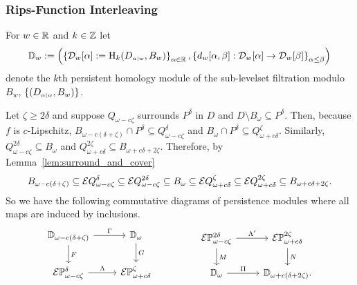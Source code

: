 
\subsubsection{Rips-Function Interleaving}

For $w\in\mathbb{R}$ and $k\in\mathbb{Z}$ let
\[ \mathbb{D}_{w} := \left(\left\{\mathcal{D}_{w}[\alpha] := \mathrm{H}_k(D_{\scriptscriptstyle \alpha\mid w},B_w)\right\}_{\alpha\in\mathbb{R}},\left\{d_w[\alpha,\beta] : \mathcal{D}_{w}[\alpha]\to\mathcal{D}_{w}[\beta]\right\}_{\alpha\leq\beta}\right)\]
denote the $k$th persistent homology module of the sub-levelset filtration modulo $B_w$, $\{(D_{\scriptscriptstyle \alpha\mid w},B_w)\}$.

Let $\zeta\geq 2\delta$ and suppose $Q_{\omega-c\zeta}$ surrounds $P^\delta$ in $D$ and $D\setminus B_\omega\subseteq P^\delta$.
Then, because $f$ is $c$-Lipschitz, $B_{\omega-c(\delta+\zeta)}\cap P^\delta\subseteq Q_{\omega-c\zeta}^\delta$ and $B_\omega\cap P^\delta\subseteq Q_{\omega+c\delta}^\zeta$.
Similarly, $Q_{\omega-c\zeta}^{2\delta}\subseteq B_\omega$ and $Q_{\omega+c\delta}^{2\zeta}\subseteq B_{\omega+c{\delta+2\zeta}}$.
Therefore, by Lemma~\ref{lem:surround_and_cover}
\[ B_{\omega-c(\delta+\zeta)}\subseteq \mathcal{E} Q_{\omega-c\zeta}^\delta\subseteq\mathcal{E} Q_{\omega-c\zeta}^{2\delta}\subseteq B_\omega
  \subseteq \mathcal{E} Q_{\omega+c\delta}^\zeta\subseteq \mathcal{E} Q_{\omega+c\delta}^{2\zeta}\subseteq B_{\omega+c{\delta+2\zeta}}.\]
So we have the following commutative diagrams of persistence modules where all maps are induced by inclusions.
\[\begin{tikzcd}
    \DD{\omega-c(\delta+\zeta)} \arrow{r}{\Gamma}\arrow{d}{F} &
    \DD{\omega} \arrow{d}{G}\\
    \E\PP{\omega-c\zeta}{\delta}\arrow{r}{\Lambda} &
    \E\PP{\omega+c\delta}{\zeta}
  \end{tikzcd}\hspace{10ex}
  \begin{tikzcd}
    \E\PP{\omega-c\zeta}{2\delta} \arrow{r}{\Lambda'}\arrow{d}{M} &
    \E\PP{\omega+c\delta}{2\zeta}\arrow{d}{N}\\
    \DD{\omega} \arrow{r}{\Pi} &
    \DD{\omega+c(\delta+2\zeta)}.
  \end{tikzcd}\]

